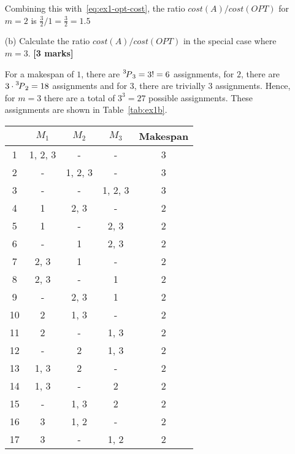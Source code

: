 \begin{enumerate}
    Combining this with~\eqref{eq:ex1-opt-cost}, the ratio $cost(A)/cost(OPT)$ for $m = 2$ is $\frac{3}{2} / 1 = \frac{3}{2} = 1.5$

    \item[(b)] Calculate the ratio $cost(A)/cost(OPT)$ in the special case where $m=3$.  \hfill{\bf [3 marks]}\smallskip

    For a makespan of $1$, there are $\cperm[3]{3} = 3! = 6$ assignments, for $2$, there are $3 \cdot \cperm[3]{2} = 18$ assignments and for $3$, there are trivially $3$ assignments.
    Hence, for $m = 3$ there are a total of $3^3 = 27$ possible assignments.
    These assignments are shown in Table~\ref{tab:ex1b}.

    \begin{table}[ht!]
        \centering
        \begin{tabular}{ccccc}
           & $M_1$   & $M_2$   & $M_3$   & Makespan \\ \hline
        1  & 1, 2, 3 & -       & -       & 3        \\
        2  & -       & 1, 2, 3 & -       & 3        \\
        3  & -       & -       & 1, 2, 3 & 3        \\
        4  & 1       & 2, 3    & -       & 2        \\
        5  & 1       & -       & 2, 3    & 2        \\
        6  & -       & 1       & 2, 3    & 2        \\
        7  & 2, 3    & 1       & -       & 2        \\
        8  & 2, 3    & -       & 1       & 2        \\
        9  & -       & 2, 3    & 1       & 2        \\
        10 & 2       & 1, 3    & -       & 2        \\
        11 & 2       & -       & 1, 3    & 2        \\
        12 & -       & 2       & 1, 3    & 2        \\
        13 & 1, 3    & 2       & -       & 2        \\
        14 & 1, 3    & -       & 2       & 2        \\
        15 & -       & 1, 3    & 2       & 2        \\
        16 & 3       & 1, 2    & -       & 2        \\
        17 & 3       & -       & 1, 2    & 2        \\

\end{tabular}
\end{table}
\end{enumerate}

